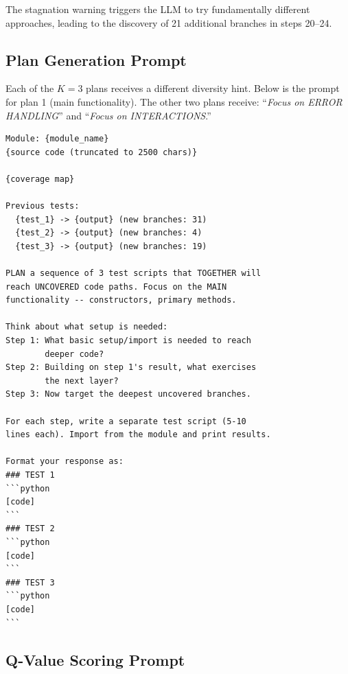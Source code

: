 The stagnation warning triggers the LLM to try fundamentally different approaches, leading to the discovery of 21 additional branches in steps 20--24.

\subsection{Plan Generation Prompt}
\label{app:plan_prompt}

Each of the $K{=}3$ plans receives a different diversity hint. Below is the prompt for plan 1 (main functionality). The other two plans receive: ``\textit{Focus on ERROR HANDLING}'' and ``\textit{Focus on INTERACTIONS}.''

\begin{tcolorbox}[colback=blue!3!white, colframe=blue!40!black, title=Plan Generation Prompt (with diversity hint), fonttitle=\bfseries\small]
\begin{small}
\begin{verbatim}
Module: {module_name}
{source code (truncated to 2500 chars)}

{coverage map}

Previous tests:
  {test_1} -> {output} (new branches: 31)
  {test_2} -> {output} (new branches: 4)
  {test_3} -> {output} (new branches: 19)

PLAN a sequence of 3 test scripts that TOGETHER will
reach UNCOVERED code paths. Focus on the MAIN
functionality -- constructors, primary methods.

Think about what setup is needed:
Step 1: What basic setup/import is needed to reach
        deeper code?
Step 2: Building on step 1's result, what exercises
        the next layer?
Step 3: Now target the deepest uncovered branches.

For each step, write a separate test script (5-10
lines each). Import from the module and print results.

Format your response as:
### TEST 1
```python
[code]
```
### TEST 2
```python
[code]
```
### TEST 3
```python
[code]
```
\end{verbatim}
\end{small}
\end{tcolorbox}

\subsection{Q-Value Scoring Prompt}
\label{app:qvalue_prompt}

